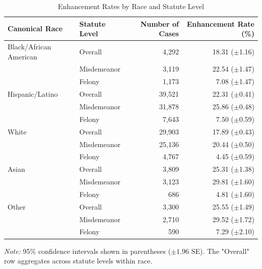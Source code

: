 \begin{table}
\caption{Enhancement Rates by Race and Statute Level}
\label{tab:enhancement_overall}
\begin{tabular}{llrr}
\toprule
Canonical Race & Statute Level & Number of Cases & Enhancement Rate (\%) \\
\midrule
\rowcolor{gray!15} Black/African American & Overall & 4,292 & 18.31 ({\scriptsize $\pm$1.16}) \\
 & Misdemeanor & 3,119 & 22.54 ({\scriptsize $\pm$1.47}) \\
 & Felony & 1,173 & 7.08 ({\scriptsize $\pm$1.47}) \\
\midrule
\rowcolor{gray!15} Hispanic/Latino & Overall & 39,521 & 22.31 ({\scriptsize $\pm$0.41}) \\
 & Misdemeanor & 31,878 & 25.86 ({\scriptsize $\pm$0.48}) \\
 & Felony & 7,643 & 7.50 ({\scriptsize $\pm$0.59}) \\
\midrule
\rowcolor{gray!15} White & Overall & 29,903 & 17.89 ({\scriptsize $\pm$0.43}) \\
 & Misdemeanor & 25,136 & 20.44 ({\scriptsize $\pm$0.50}) \\
 & Felony & 4,767 & 4.45 ({\scriptsize $\pm$0.59}) \\
\midrule
\rowcolor{gray!15} Asian & Overall & 3,809 & 25.31 ({\scriptsize $\pm$1.38}) \\
 & Misdemeanor & 3,123 & 29.81 ({\scriptsize $\pm$1.60}) \\
 & Felony & 686 & 4.81 ({\scriptsize $\pm$1.60}) \\
\midrule
\rowcolor{gray!15} Other & Overall & 3,300 & 25.55 ({\scriptsize $\pm$1.49}) \\
 & Misdemeanor & 2,710 & 29.52 ({\scriptsize $\pm$1.72}) \\
 & Felony & 590 & 7.29 ({\scriptsize $\pm$2.10}) \\
\bottomrule
\end{tabular}
\smallskip
\parbox{\textwidth}{\footnotesize \textit{Note:} 95\% confidence intervals shown in parentheses ($\pm 1.96$ SE). The "Overall" row aggregates across statute levels within race.}
\end{table}